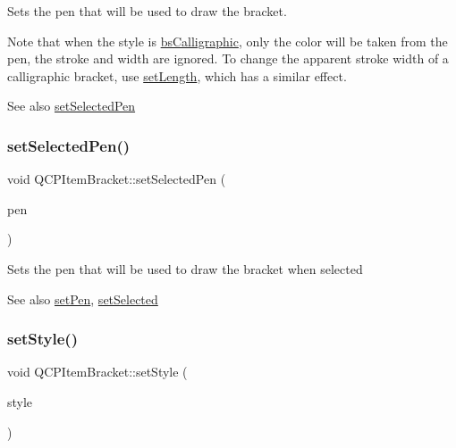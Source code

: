 Sets the pen that will be used to draw the bracket.

Note that when the style is \mbox{\hyperlink{class_q_c_p_item_bracket_a7ac3afd0b24a607054e7212047d59dbda8f29f5ef754e2dc9a9efdedb2face0f3}{bs\+Calligraphic}}, only the color will be taken from the pen, the stroke and width are ignored. To change the apparent stroke width of a calligraphic bracket, use \mbox{\hyperlink{class_q_c_p_item_bracket_ac7cfc3da7da9b5c5ac5dfbe4f0351b2a}{set\+Length}}, which has a similar effect.

\begin{DoxySeeAlso}{See also}
\mbox{\hyperlink{class_q_c_p_item_bracket_a349785c31122778a520c64891fa204c5}{set\+Selected\+Pen}} 
\end{DoxySeeAlso}
\mbox{\label{class_q_c_p_item_bracket_a349785c31122778a520c64891fa204c5}} 
\subsubsection{\texorpdfstring{set\+Selected\+Pen()}{setSelectedPen()}}
{\footnotesize\ttfamily void Q\+C\+P\+Item\+Bracket\+::set\+Selected\+Pen (\begin{DoxyParamCaption}\item[{const Q\+Pen \&}]{pen }\end{DoxyParamCaption})}

Sets the pen that will be used to draw the bracket when selected

\begin{DoxySeeAlso}{See also}
\mbox{\hyperlink{class_q_c_p_item_bracket_ab13001d9cc5d8f9e56ea15bdda682acb}{set\+Pen}}, \mbox{\hyperlink{class_q_c_p_abstract_item_a203de94ad586cc44d16c9565f49d3378}{set\+Selected}} 
\end{DoxySeeAlso}
\mbox{\label{class_q_c_p_item_bracket_a612dffa2373422eef8754d690add3703}} 
\subsubsection{\texorpdfstring{set\+Style()}{setStyle()}}
{\footnotesize\ttfamily void Q\+C\+P\+Item\+Bracket\+::set\+Style (\begin{DoxyParamCaption}\item[{\mbox{\hyperlink{class_q_c_p_item_bracket_a7ac3afd0b24a607054e7212047d59dbd}{Q\+C\+P\+Item\+Bracket\+::\+Bracket\+Style}}}]{style }\end{DoxyParamCaption})}

